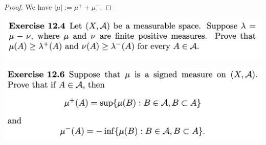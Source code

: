 \begin{proof}
  We have $|\mu| := \mu^+ + \mu^-$.


\end{proof}


\newpage
\begin{mdframed}
\includegraphics[width=400pt]{img/analysis--berkeley-202a-hw10-8336.png}
\end{mdframed}

\newpage
\begin{mdframed}
\includegraphics[width=400pt]{img/analysis--berkeley-202a-hw10-0220.png}
\end{mdframed}
